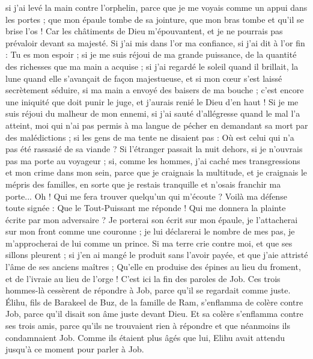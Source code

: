 \begin{multicols}{2}
si j'ai levé la main contre l'orphelin, parce que je me voyais comme un appui dans les portes ;
que mon épaule tombe de sa jointure, que mon bras tombe et qu'il se brise l'os !
Car les châtiments de Dieu m'épouvantent, et je ne pourrais pas prévaloir devant sa majesté.
Si j'ai mis dans l'or ma confiance, si j'ai dit à l'or fin : Tu es mon espoir ;
si je me suis réjoui de ma grande puissance, de la quantité des richesses que ma main a acquise ;
si j'ai regardé le soleil quand il brillait, la lune quand elle s'avançait de façon majestueuse,
et si mon cœur s'est laissé secrètement séduire, si ma main a envoyé des baisers de ma bouche ;
c'est encore une iniquité que doit punir le juge, et j'aurais renié le Dieu d'en haut !
Si je me suis réjoui du malheur de mon ennemi, si j'ai sauté d'allégresse quand le mal l'a atteint,
moi qui n'ai pas permis à ma langue de pécher en demandant sa mort par des malédictions ;
si les gens de ma tente ne disaient pas : Où est celui qui n'a pas été rassasié de sa viande ?
Si l'étranger passait la nuit dehors, si je n'ouvrais pas ma porte au voyageur ;
si, comme les hommes, j'ai caché mes transgressions et mon crime dans mon sein,
parce que je craignais la multitude, et je craignais le mépris des familles, en sorte que je restais tranquille et n'osais franchir ma porte...
Oh ! Qui me fera trouver quelqu'un qui m'écoute ? Voilà ma défense toute signée : Que le Tout-Puissant me réponde ! Qui me donnera la plainte écrite par mon adversaire ?
Je porterai son écrit sur mon épaule, je l'attacherai sur mon front comme une couronne ;
je lui déclarerai le nombre de mes pas, je m'approcherai de lui comme un prince.
Si ma terre crie contre moi, et que ses sillons pleurent ;
si j'en ai mangé le produit sans l'avoir payée, et que j'aie attristé l'âme de ses anciens maîtres ;
Qu'elle en produise des épines au lieu du froment, et de l'ivraie au lieu de l'orge ! C'est ici la fin des paroles de Job.
\VerseOne{}Ces trois hommes-là cessèrent de répondre à Job, parce qu'il se regardait comme juste.
Élihu, fils de Barakeel de Buz, de la famille de Ram, s'enflamma de colère contre Job, parce qu'il disait son âme juste devant Dieu.
Et sa colère s'enflamma contre ses trois amis, parce qu'ils ne trouvaient rien à répondre et que néanmoins ils condamnaient Job.
Comme ils étaient plus âgés que lui, Elihu avait attendu jusqu'à ce moment pour parler à Job.

\end{multicols}
